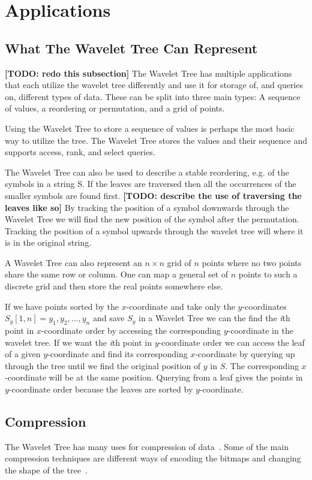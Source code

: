\section{Applications}
\subsection{What The Wavelet Tree Can Represent}
\textbf{[TODO: redo this subsection]}
The Wavelet Tree has multiple applications that each utilize the wavelet tree differently and use it for storage of, and queries on, different types of data.
These can be split into three main types: A sequence of values, a reordering or permutation, and a grid of points.

Using the Wavelet Tree to store a sequence of values is perhaps the most basic way to utilize the tree.
The Wavelet Tree stores the values and their sequence and supports access, rank, and select queries.

The Wavelet Tree can also be used to describe a stable reordering, e.g. of the symbols in a string S. 
If the leaves are traversed then all the occurrences of the smaller symbols are found first. \textbf{[TODO: describe the use of traversing the leaves like so]}
By tracking the position of a symbol downwards through the Wavelet Tree we will find the new position of the symbol after the permutation.
Tracking the position of a symbol upwards through the wavelet tree will where it is in the original string. 

A Wavelet Tree can also represent an $n \times n$ grid of $n$ points where no two points share the same row or column. 
One can map a general set of $n$ points to such a discrete grid and then store the real points somewhere else.

If we have points sorted by the $x$-coordinate and take only the $y$-coordinates $S_y[1,n] = y_1,y_2,...,y_n$ and save $S_y$ in a Wavelet Tree we can the find the \textit{i}th point in $x$-coordinate order by accessing the corresponding $y$-coordinate in the wavelet tree. 
If we want the \textit{i}th point in $y$-coordinate order we can access the leaf of a given $y$-coordinate and find its corresponding $x$-coordinate by querying up through the tree until we find the original position of $y$ in $S$. 
The corresponding $x$-coordinate will be at the same position.
Querying from a leaf gives the points in $y$-coordinate order because the leaves are sorted by $y$-coordinate.

\subsection{Compression}
The Wavelet Tree has many uses for compression of data~\citep{Navjda13}.
Some of the main compression techniques are different ways of encoding the bitmaps and changing the shape of the tree~\citep[Section~3]{Navjda13}.


